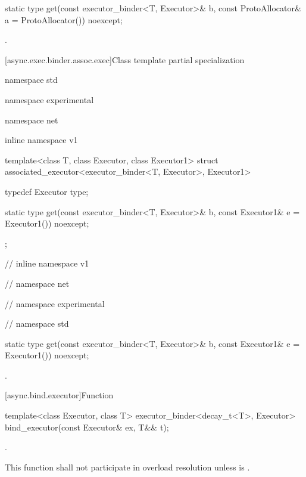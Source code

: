 \begin{itemdecl}
static type get(const executor_binder<T, Executor>& b,
                const ProtoAllocator& a = ProtoAllocator()) noexcept;
\end{itemdecl}

\begin{itemdescr}
\pnum
\returns {}.
\end{itemdescr}



[async.exec.binder.assoc.exec]{Class template partial specialization }

\begin{codeblock}
namespace std {
namespace experimental {
namespace net {
inline namespace v1 {

  template<class T, class Executor, class Executor1>
    struct associated_executor<executor_binder<T, Executor>, Executor1>
  {
    typedef Executor type;

    static type get(const executor_binder<T, Executor>& b,
                    const Executor1& e = Executor1()) noexcept;
  };

} // inline namespace v1
} // namespace net
} // namespace experimental
} // namespace std
\end{codeblock}

\begin{itemdecl}
static type get(const executor_binder<T, Executor>& b,
                const Executor1& e = Executor1()) noexcept;
\end{itemdecl}

\begin{itemdescr}
\pnum
\returns {}.
\end{itemdescr}




[async.bind.executor]{Function }

\begin{itemdecl}
template<class Executor, class T>
  executor_binder<decay_t<T>, Executor>
    bind_executor(const Executor& ex, T&& t);
\end{itemdecl}

\begin{itemdescr}
\pnum
\returns {}.

\pnum
\remarks This function shall not participate in overload resolution unless  is .
\end{itemdescr}

